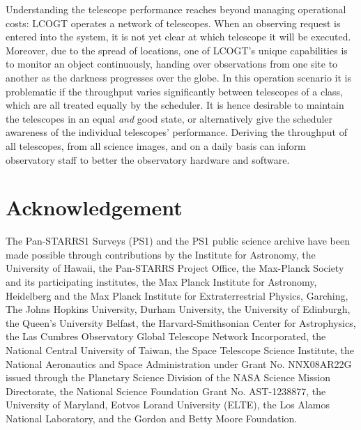 \documentclass[]{spieman}
\begin{document}
Understanding the telescope performance reaches beyond managing operational costs: LCOGT operates a
network of telescopes. When an observing request is entered into the system, it is not yet clear at
which telescope it will be executed. Moreover, due to the spread of locations, one of LCOGT's 
unique capabilities is to monitor an object continuously, handing over observations from one site  
to another as the darkness progresses over the globe. In this operation scenario it is problematic
if the throughput varies significantly between telescopes of a class, which are all treated equally 
by the scheduler.  It is hence desirable to maintain the telescopes in an equal {\it and} good
state, or alternatively give the scheduler awareness of the individual telescopes' performance.
Deriving the throughput of all telescopes, from all science images, and on a daily basis can inform 
observatory staff to better the observatory hardware and software.




\section{Acknowledgement}
The Pan-STARRS1 Surveys (PS1) and the PS1 public science archive have been made possible through
contributions by the Institute for Astronomy, the University of Hawaii, the Pan-STARRS Project
Office, the Max-Planck Society and its participating institutes, the Max Planck Institute for
Astronomy, Heidelberg and the Max Planck Institute for Extraterrestrial Physics, Garching, The Johns
Hopkins University, Durham University, the University of Edinburgh, the Queen's University Belfast,
the Harvard-Smithsonian Center for Astrophysics, the Las Cumbres Observatory Global Telescope
Network Incorporated, the National Central University of Taiwan, the Space Telescope Science
Institute, the National Aeronautics and Space Administration under Grant No. NNX08AR22G issued
through the Planetary Science Division of the NASA Science Mission Directorate, the National Science
Foundation Grant No. AST-1238877, the University of Maryland, Eotvos Lorand University (ELTE), the
Los Alamos National Laboratory, and the Gordon and Betty Moore Foundation.




\end{document}
